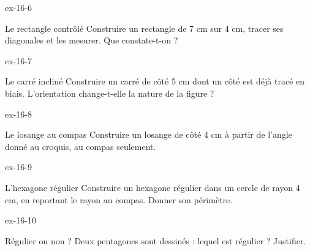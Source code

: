 \begin{blocLivre}{ex-16-6}\begin{exercice}[2]{Le rectangle contrôlé}
Construire un rectangle de 7 cm sur 4 cm, tracer ses diagonales et les mesurer. Que constate-t-on ?
\label{fig-ex-16-6}
\end{exercice}\end{blocLivre}
\begin{blocLivre}{ex-16-7}\begin{exercice}[2]{Le carré incliné}
Construire un carré de côté 5 cm dont un côté est déjà tracé en biais. L’orientation change-t-elle la nature de la figure ?
\label{fig-ex-16-7}
\end{exercice}\end{blocLivre}
\begin{blocLivre}{ex-16-8}\begin{exercice}[2]{Le losange au compas}
Construire un losange de côté 4 cm à partir de l’angle donné au croquis, au compas seulement.
\label{fig-ex-16-8}
\end{exercice}\end{blocLivre}
\begin{blocLivre}{ex-16-9}\begin{exercice}[2]{L’hexagone régulier}
Construire un hexagone régulier dans un cercle de rayon 4 cm, en reportant le rayon au compas. Donner son périmètre.
\label{fig-ex-16-9}
\end{exercice}\end{blocLivre}
\begin{blocLivre}{ex-16-10}\begin{exercice}[2]{Régulier ou non ?}
Deux pentagones sont dessinés : lequel est régulier ? Justifier.
\label{fig-ex-16-10}
\end{exercice}\end{blocLivre}

